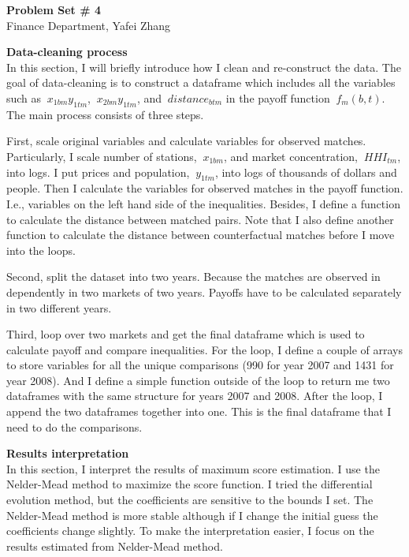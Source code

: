 \documentclass[letterpaper,12pt]{article}
\theoremstyle{definition}
\begin{document}
	
\begin{flushleft}
	\textbf{\large{Problem Set \# 4}} \\
	Finance Department, Yafei Zhang \\
		
		
\end{flushleft}
	
\vspace{5mm}

\noindent\textbf{Data-cleaning process} \\
In this section, I will briefly introduce how I clean and re-construct the data. The goal of data-cleaning is to construct a dataframe which includes all the variables such as $\ x_{1bm}y_{1tm} $, $\ x_{2bm}y_{1tm} $, and $\ distance_{btm} $ in the payoff function $\ f_m(b, t) $. The main process consists of three steps.

First, scale original variables and calculate variables for observed matches. Particularly, I scale number of stations, $\ x_{1bm}$, and market concentration, $\ HHI_{tm}$, into logs. I put prices and population, $\ y_{1tm}$, into logs of thousands of dollars and people. Then I calculate the variables for observed matches in the payoff function. I.e., variables on the left hand side of the inequalities. Besides, I define a function to calculate the distance between matched pairs. Note that I also define another function to calculate the distance between counterfactual matches before I move into the loops.

Second, split the dataset into two years. Because the matches are observed in dependently in two markets of two years. Payoffs have to be calculated separately in two different years.

Third, loop over two markets and get the final dataframe which is used to calculate payoff and compare inequalities. For the loop, I define a couple of arrays to store variables for all the unique comparisons (990 for year 2007 and 1431 for year 2008). And I define a simple function outside of the loop to return me two dataframes with the same structure for years 2007 and 2008. After the loop, I append the two dataframes together into one. This is the final dataframe that I need to do the comparisons.

\vspace{5mm}

\noindent\textbf{Results interpretation} \\
In this section, I interpret the results of maximum score estimation. I use the Nelder-Mead method to maximize the score function. I tried the differential evolution method, but the coefficients are sensitive to the bounds I set. The Nelder-Mead method is more stable although if I change the initial guess the coefficients change slightly. To make the interpretation easier, I focus on the results estimated from Nelder-Mead method.
\end{document}
